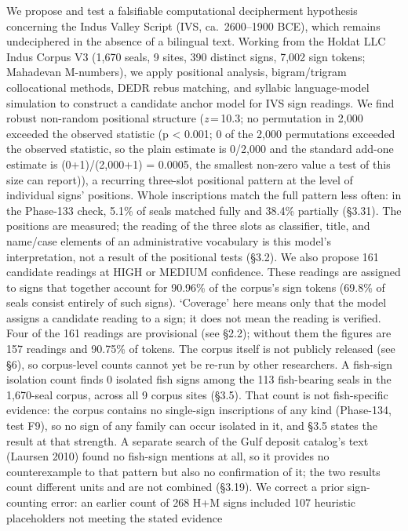 \documentclass[
]{article}
\begin{document}
We propose and test a falsifiable computational decipherment hypothesis
concerning the Indus Valley Script (IVS, ca.~2600--1900 BCE), which
remains undeciphered in the absence of a bilingual text. Working from the
Holdat LLC Indus Corpus V3 (1,670 seals, 9 sites, 390 distinct signs,
7,002 sign tokens; Mahadevan M-numbers), we apply positional analysis,
bigram/trigram collocational methods, DEDR rebus matching, and syllabic
language-model simulation to construct a candidate anchor model for IVS
sign readings. We find robust non-random positional structure
(\textit{z}\,=\,10.3; no permutation in 2,000 exceeded the observed statistic (p \textless{} 0.001; 0 of the 2,000 permutations exceeded the observed statistic, so the plain estimate is 0/2,000 and the standard add-one estimate is (0+1)/(2,000+1) = 0.0005, the smallest non-zero value a test of this size can report)),
a recurring three-slot positional pattern at the level of individual signs' positions. Whole inscriptions match the full pattern less often: in the Phase-133 check, 5.1\% of seals matched fully and 38.4\% partially (§3.31). The positions are measured; the reading of the three slots as classifier, title, and name/case elements of an administrative vocabulary is this model's interpretation, not a result of the positional tests (§3.2). We also propose 161 candidate readings at HIGH or MEDIUM confidence. These readings are assigned to signs that together account for 90.96\% of the corpus's sign tokens (69.8\% of seals consist entirely of such signs). `Coverage' here means only that the model assigns a candidate reading to a sign; it does not mean the reading is verified. Four of the 161 readings are provisional (see §2.2); without them the figures are 157 readings and 90.75\% of tokens. The corpus itself is not publicly released (see §6), so corpus-level counts cannot yet be re-run by other researchers. A fish-sign isolation count finds 0 isolated fish signs among the 113 fish-bearing seals in the 1,670-seal corpus, across all 9 corpus sites (§3.5). That count is not fish-specific evidence: the corpus contains no single-sign inscriptions of any kind (Phase-134, test F9), so no sign of any family can occur isolated in it, and §3.5 states the result at that strength. A separate search of the Gulf deposit catalog's text (Laursen 2010) found no fish-sign mentions at all, so it provides no counterexample to that pattern but also no confirmation of it; the two results count different units and are not combined (§3.19).
We correct a prior sign-counting error: an earlier count of 268 H+M signs
included 107 heuristic placeholders not meeting the stated evidence
\end{document}
